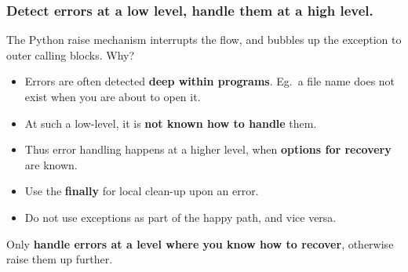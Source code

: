 \documentclass{beamer} %
\newcommand\emc[1]{\textcolor{brightblue}{\textbf{#1}}}
\begin{document}
\begin{frame}
\frametitle{Detect errors at a low level, handle them at a high level.}

The Python raise mechanism interrupts the flow, and bubbles up the exception to outer calling blocks. Why?
\begin{itemize}
\item Errors are often detected \emc{deep within programs}. Eg.\ a file name does not exist when you are about to open it.
\item At such a low-level, it is \emc{not known how to handle} them.
\item Thus error handling happens at a higher level, when \emc{options for recovery} are known.
\item Use the \emc{finally} for local clean-up upon an error.
\item Do not use exceptions as part of the happy path, and vice versa.
\end{itemize}

\vspace{3mm}
Only \emc{handle errors at a level where you know how to recover}, otherwise raise them up further.

\end{frame}


\end{document}
